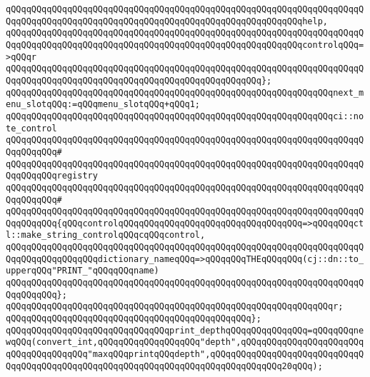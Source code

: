 \verb|qQQqqQQqqQQqqQQqqQQqqQQqqQQqqQQqqQQqqQQqqQQqqQQqqQQqqQQqqQQqqQQqqQQqqQQqqQQqqQQqqQQqqQQqqQQqqQQqqQQqqQQqqQQqqQQqqQQqqQQqqQQqqQQqhelp,|\newline
\verb|qQQqqQQqqQQqqQQqqQQqqQQqqQQqqQQqqQQqqQQqqQQqqQQqqQQqqQQqqQQqqQQqqQQqqQQqqQQqqQQqqQQqqQQqqQQqqQQqqQQqqQQqqQQqqQQqqQQqqQQqqQQqqQQqcontrolqQQq=>qQQqr|\newline
\verb|qQQqqQQqqQQqqQQqqQQqqQQqqQQqqQQqqQQqqQQqqQQqqQQqqQQqqQQqqQQqqQQqqQQqqQQqqQQqqQQqqQQqqQQqqQQqqQQqqQQqqQQqqQQqqQQqqQQqqQQq};|\newline
\newline
\verb|qQQqqQQqqQQqqQQqqQQqqQQqqQQqqQQqqQQqqQQqqQQqqQQqqQQqqQQqqQQqqQQqnext_menu_slotqQQq:=qQQqmenu_slotqQQq+qQQq1;|\newline
\newline
\verb|qQQqqQQqqQQqqQQqqQQqqQQqqQQqqQQqqQQqqQQqqQQqqQQqqQQqqQQqqQQqqQQqci::note_control|\newline
\verb|qQQqqQQqqQQqqQQqqQQqqQQqqQQqqQQqqQQqqQQqqQQqqQQqqQQqqQQqqQQqqQQqqQQqqQQqqQQqqQQq#|\newline
\verb|qQQqqQQqqQQqqQQqqQQqqQQqqQQqqQQqqQQqqQQqqQQqqQQqqQQqqQQqqQQqqQQqqQQqqQQqqQQqqQQqregistry|\newline
\verb|qQQqqQQqqQQqqQQqqQQqqQQqqQQqqQQqqQQqqQQqqQQqqQQqqQQqqQQqqQQqqQQqqQQqqQQqqQQqqQQq#|\newline
\verb|qQQqqQQqqQQqqQQqqQQqqQQqqQQqqQQqqQQqqQQqqQQqqQQqqQQqqQQqqQQqqQQqqQQqqQQqqQQqqQQq{qQQqcontrolqQQqqQQqqQQqqQQqqQQqqQQqqQQqqQQqqQQq=>qQQqqQQqctl::make_string_controlqQQqcqQQqcontrol,|\newline
\verb|qQQqqQQqqQQqqQQqqQQqqQQqqQQqqQQqqQQqqQQqqQQqqQQqqQQqqQQqqQQqqQQqqQQqqQQqqQQqqQQqqQQqqQQqdictionary_nameqQQq=>qQQqqQQqTHEqQQqqQQq(cj::dn::to_upperqQQq"PRINT_"qQQqqQQqname)|\newline
\verb|qQQqqQQqqQQqqQQqqQQqqQQqqQQqqQQqqQQqqQQqqQQqqQQqqQQqqQQqqQQqqQQqqQQqqQQqqQQqqQQq};|\newline
\newline
\verb|qQQqqQQqqQQqqQQqqQQqqQQqqQQqqQQqqQQqqQQqqQQqqQQqqQQqqQQqqQQqqQQqr;|\newline
\verb|qQQqqQQqqQQqqQQqqQQqqQQqqQQqqQQqqQQqqQQqqQQqqQQq};|\newline
\newline
\verb|qQQqqQQqqQQqqQQqqQQqqQQqqQQqqQQqprint_depthqQQqqQQqqQQqqQQq=qQQqqQQqnewqQQq(convert_int,qQQqqQQqqQQqqQQqqQQq"depth",qQQqqQQqqQQqqQQqqQQqqQQqqQQqqQQqqQQqqQQq"maxqQQqprintqQQqdepth",qQQqqQQqqQQqqQQqqQQqqQQqqQQqqQQqqQQqqQQqqQQqqQQqqQQqqQQqqQQqqQQqqQQqqQQqqQQqqQQqqQQq20qQQq);|\newline
